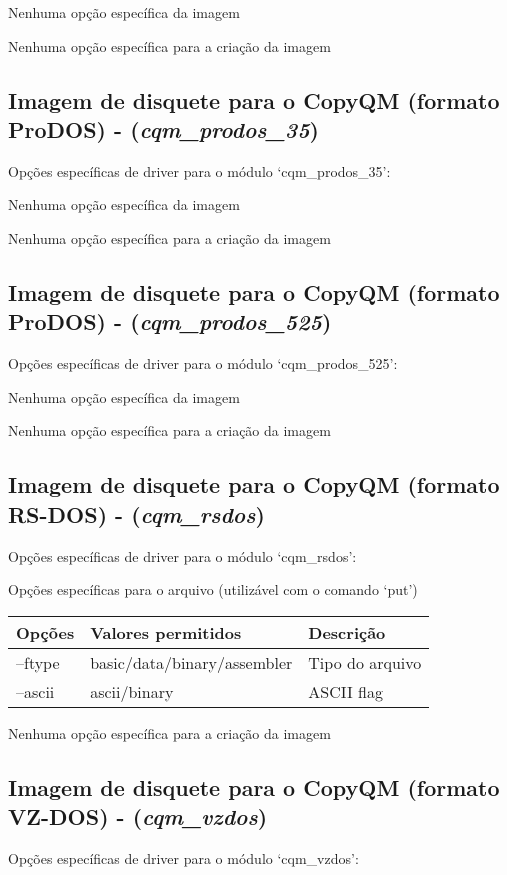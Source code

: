 \documentclass[letterpaper,10pt,brazil]{sphinxmanual}
\begin{document}
Nenhuma opção específica da imagem

Nenhuma opção específica para a criação da imagem


\subsection{Imagem de disquete para o CopyQM (formato ProDOS) - (\emph{cqm\_prodos\_35})}
\label{tools/imgtool:imagem-de-disquete-para-o-copyqm-formato-prodos-cqm-prodos-35}
Opções específicas de driver para o módulo `cqm\_prodos\_35':

Nenhuma opção específica da imagem

Nenhuma opção específica para a criação da imagem


\subsection{Imagem de disquete para o CopyQM (formato ProDOS) - (\emph{cqm\_prodos\_525})}
\label{tools/imgtool:imagem-de-disquete-para-o-copyqm-formato-prodos-cqm-prodos-525}
Opções específicas de driver para o módulo `cqm\_prodos\_525':

Nenhuma opção específica da imagem

Nenhuma opção específica para a criação da imagem


\subsection{Imagem de disquete para o CopyQM (formato RS-DOS) - (\emph{cqm\_rsdos})}
\label{tools/imgtool:imagem-de-disquete-para-o-copyqm-formato-rs-dos-cqm-rsdos}
Opções específicas de driver para o módulo `cqm\_rsdos':

Opções específicas para o arquivo (utilizável com o comando `put')

\noindent\begin{tabulary}{\linewidth}{|L|L|L|}
\hline

Opções
&
Valores permitidos
&
Descrição
\\
\hline
--ftype
&
basic/data/binary/assembler
&
Tipo do arquivo
\\
\hline
--ascii
&
ascii/binary
&
ASCII flag
\\
\hline\end{tabulary}


Nenhuma opção específica para a criação da imagem


\subsection{Imagem de disquete para o CopyQM (formato VZ-DOS) - (\emph{cqm\_vzdos})}
\label{tools/imgtool:imagem-de-disquete-para-o-copyqm-formato-vz-dos-cqm-vzdos}
Opções específicas de driver para o módulo `cqm\_vzdos':
\end{document}
